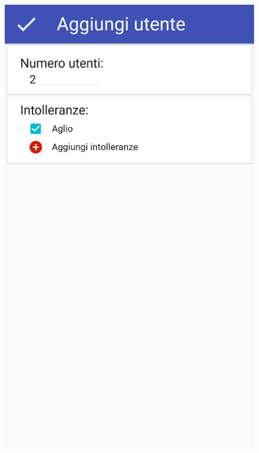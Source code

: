 \begin{figure}[H]
\begin{minipage}{.49\textwidth}
		\includegraphics[width=\textwidth]{img/wireframe/aggiungi_utente_generico_ok.png}
	\end{minipage}
\end{figure}
